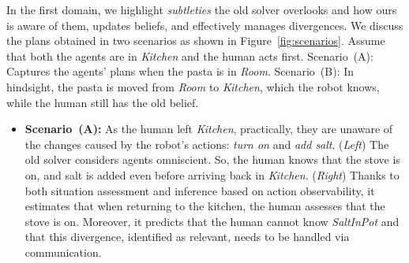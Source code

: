 \documentclass[letterpaper]{article} %
\begin{document}
In the first domain, we highlight \textit{subtleties} the old solver overlooks and how ours is aware of them, updates beliefs, and effectively manages divergences. 
We discuss the plans obtained in two scenarios 
as shown in Figure~\ref{fig:scenarios}. Assume that both the agents are in \textit{Kitchen} and the human acts first. Scenario~(A): Captures the agents' plans when the pasta is in \textit{Room}. 
Scenario~(B): 
In hindsight, the pasta is moved from \textit{Room} to {\em Kitchen}, which the robot knows, while the human still has the old belief.

\begin{itemize}
    \item \textbf{Scenario~(A):} 
    As the human left {\em Kitchen}, practically, they are unaware of the changes caused by the robot's actions: {\em turn on} and {\em add salt}. (\textit{Left}) The old solver considers agents omniscient. So, the human knows that the stove is {\sc on}, and salt is added even before arriving back in {\em Kitchen}. (\textit{Right}) Thanks to both situation assessment and inference based on action observability, it estimates that when returning to the kitchen, the human assesses that the stove is {\sc on}. Moreover, it predicts that the human cannot know \textit{SaltInPot} and that this divergence, identified as relevant, needs to be handled via communication.

\end{itemize}
\end{document}
